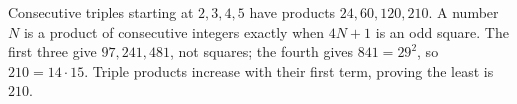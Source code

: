 Consecutive triples starting at $2,3,4,5$ have products $24,60,120,210$. A number $N$ is a product of consecutive integers exactly when $4N+1$ is an odd square. The first three give $97,241,481$, not squares; the fourth gives $841=29^2$, so $210=14\cdot15$. Triple products increase with their first term, proving the least is $\boxed{210}$.

